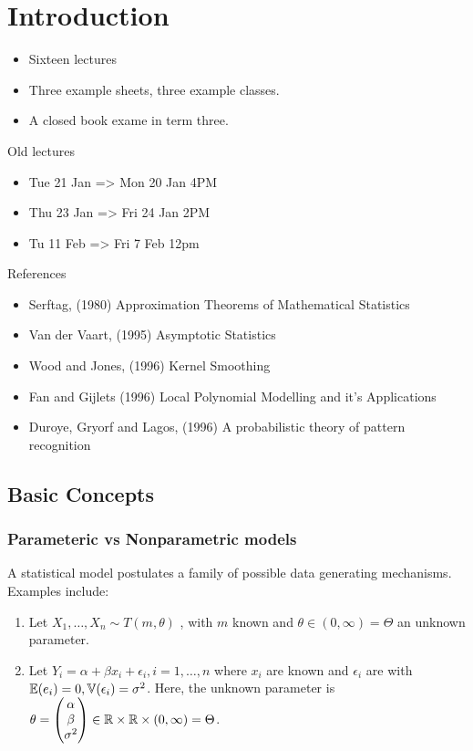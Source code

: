 \chapter{Introduction}
\label{cha:introduction}

\begin{itemize}
\item Sixteen lectures
\item Three example sheets, three example classes.
\item A closed book exame in term three.
\end{itemize}

Old lectures
\begin{itemize}
\item Tue 21 Jan => Mon 20 Jan 4PM
\item Thu 23 Jan => Fri 24 Jan 2PM
\item  Tu 11 Feb => Fri 7 Feb 12pm
\end{itemize}

References

\begin{itemize}
\item Serftag, (1980) Approximation Theorems of Mathematical Statistics
\item Van der Vaart, (1995) Asymptotic Statistics
\item Wood and Jones, (1996) Kernel Smoothing
\item Fan and Gijlets (1996) Local Polynomial Modelling and it's Applications
\item Duroye, Gryorf and Lagos, (1996) A probabilistic theory of pattern recognition

\end{itemize}

\section{Basic Concepts}
\label{sec:basic-concepts}

\subsection{Parameteric vs Nonparametric models}
\label{sec:param-vs-nonp}

A statistical model postulates a family of possible data generating
mechanisms.  Examples include:
\begin{enumerate}
\item Let $X_{1}, \dots, X_{n} \sim T(m, \theta)$ \iid, with $m$ known
  and $\theta \in (0, \infty) = \Theta$ an unknown parameter.
\item Let $Y_{i} = \alpha + \beta x_{i}+ \epsilon_{i}, i = 1, \dots,
  n$ where $x_{i}$ are known and $\epsilon_{i}$ are \iid with
  $\E{e_{i}} = 0, \Var{\epsilon_{i}} = \sigma^{2}$.  Here, the unknown
  parameter is $\theta =
  \begin{pmatrix}
    \alpha \\
    \beta \\
    \sigma^{2}
  \end{pmatrix} \in \mathbb{R} \times \mathbb{R} \times (0, \infty) = \Theta$.
\end{enumerate}

